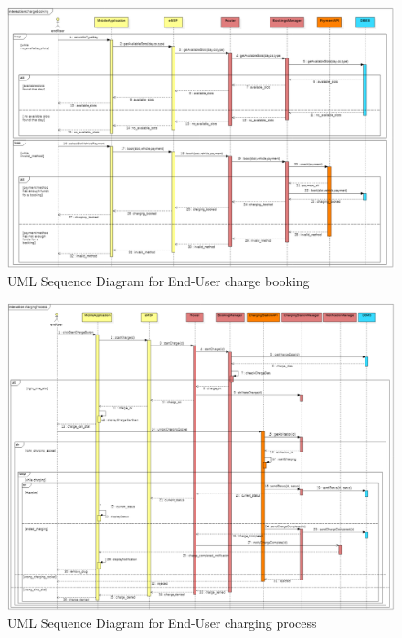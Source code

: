 \documentclass[a4paper]{report}
\begin{document}
\begin{landscape}
\begin{figure}[hp]
\centering
\includegraphics[scale=0.6]{img/sequenceChargeBooking.png}
\caption{UML Sequence Diagram for End-User charge booking}
\label{fig:seq-booking}
\end{figure}
\end{landscape}

\begin{landscape}
\begin{figure}[hp]
\centering
\includegraphics[scale=0.6]{img/sequenceChargingProcess.png}
\caption{UML Sequence Diagram for End-User charging process}
\label{fig:seq-charge}
\end{figure}
\end{landscape}
\end{document}
